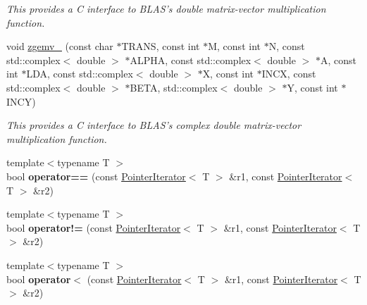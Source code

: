 \begin{DoxyCompactItemize}
\begin{DoxyCompactList}\small\item\em This provides a C interface to B\-L\-A\-S's double matrix-\/vector multiplication function. \end{DoxyCompactList}\item 
\hypertarget{namespacekeycpp_aea174778653491b5fd21dd2960c0f7cb}{void \hyperlink{namespacekeycpp_aea174778653491b5fd21dd2960c0f7cb}{zgemv\-\_\-} (const char $\ast$T\-R\-A\-N\-S, const int $\ast$M, const int $\ast$N, const std\-::complex$<$ double $>$ $\ast$A\-L\-P\-H\-A, const std\-::complex$<$ double $>$ $\ast$A, const int $\ast$L\-D\-A, const std\-::complex$<$ double $>$ $\ast$X, const int $\ast$I\-N\-C\-X, const std\-::complex$<$ double $>$ $\ast$B\-E\-T\-A, std\-::complex$<$ double $>$ $\ast$Y, const int $\ast$I\-N\-C\-Y)}\label{namespacekeycpp_aea174778653491b5fd21dd2960c0f7cb}

\begin{DoxyCompactList}\small\item\em This provides a C interface to B\-L\-A\-S's complex double matrix-\/vector multiplication function. \end{DoxyCompactList}\item 
\hypertarget{namespacekeycpp_adfb32fd99bb09455f5a124df4560ab0f}{{\footnotesize template$<$typename T $>$ }\\bool {\bfseries operator==} (const \hyperlink{classkeycpp_1_1_pointer_iterator}{Pointer\-Iterator}$<$ T $>$ \&r1, const \hyperlink{classkeycpp_1_1_pointer_iterator}{Pointer\-Iterator}$<$ T $>$ \&r2)}\label{namespacekeycpp_adfb32fd99bb09455f5a124df4560ab0f}

\item 
\hypertarget{namespacekeycpp_a9358d5f3f08dd8ed262697b7e8b2a4f1}{{\footnotesize template$<$typename T $>$ }\\bool {\bfseries operator!=} (const \hyperlink{classkeycpp_1_1_pointer_iterator}{Pointer\-Iterator}$<$ T $>$ \&r1, const \hyperlink{classkeycpp_1_1_pointer_iterator}{Pointer\-Iterator}$<$ T $>$ \&r2)}\label{namespacekeycpp_a9358d5f3f08dd8ed262697b7e8b2a4f1}

\item 
\hypertarget{namespacekeycpp_a689a724b505d52660e42e1148eba1a9a}{{\footnotesize template$<$typename T $>$ }\\bool {\bfseries operator$<$} (const \hyperlink{classkeycpp_1_1_pointer_iterator}{Pointer\-Iterator}$<$ T $>$ \&r1, const \hyperlink{classkeycpp_1_1_pointer_iterator}{Pointer\-Iterator}$<$ T $>$ \&r2)}\label{namespacekeycpp_a689a724b505d52660e42e1148eba1a9a}


\end{DoxyCompactItemize}
